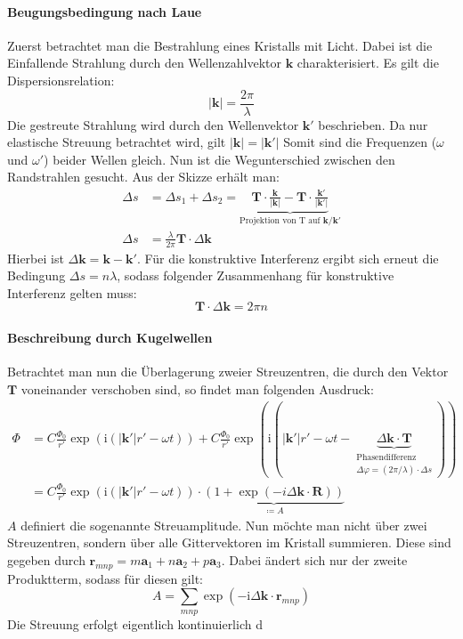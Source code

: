 \paragraph{Beugungsbedingung nach Laue}
Zuerst betrachtet man die Bestrahlung eines Kristalls mit Licht. Dabei ist die Einfallende Strahlung durch den 
Wellenzahlvektor  $\mathbf{k}$ charakterisiert. Es gilt die Dispersionsrelation:
\begin{equation}
	\lvert \mathbf{k} \rvert =\frac{2\pi}{\lambda}
\end{equation}
Die gestreute Strahlung wird durch den Wellenvektor $\mathbf{k}'$ beschrieben. Da nur elastische Streuung betrachtet wird, gilt 
$\lvert \mathbf{k} \rvert=\lvert \mathbf{k}' \rvert$ Somit sind die Frequenzen ($\omega$ und $\omega'$) beider Wellen gleich.
Nun ist die Wegunterschied zwischen den Randstrahlen gesucht. Aus der Skizze erhält man:
\begin{align*}
	\Delta s &= \Delta s_{1} + \Delta s_{2} = \underbrace{ \mathbf{T} \cdot \frac{\mathbf{k}}{\lvert \mathbf{k} \rvert }-
	\mathbf{T}\cdot \frac{\mathbf{k}'}{\lvert \mathbf{k}' \rvert}  }_{ \text{Projektion von T auf } 
	\mathbf{k}/\mathbf{k'} } \\
	\Delta s &=  \frac{\lambda}{2\pi} \mathbf{T}\cdot\Delta \mathbf{k}
\end{align*}
Hierbei ist $\Delta \mathbf{k} = \mathbf{k}-\mathbf{k}'$. Für die konstruktive Interferenz ergibt sich erneut die Bedingung $\Delta s = n \lambda$, sodass folgender Zusammenhang für konstruktive Interferenz gelten muss: 
\begin{equation}
	\mathbf{T}\cdot\Delta \mathbf{k} =2\pi n
\end{equation}

\paragraph{Beschreibung durch Kugelwellen}
Betrachtet man nun die Überlagerung zweier Streuzentren, die durch den Vektor $\mathbf{T}$ voneinander verschoben sind, so findet man folgenden Ausdruck:
\begin{align*}
	\Phi &= C \frac{\Phi_{0}}{r'}\exp(\mathrm{i}(\lvert \mathbf{k}' \rvert r'-\omega t)) + C\frac{\Phi_{0}}{r'}
	\exp(\mathrm{i}(\lvert \mathbf{k}' \rvert r'-\omega t- \underbrace{ \Delta \mathbf{k}\cdot \mathbf{T} }_{ 
	\substack{\text{Phasendifferenz} \\ \Delta\varphi=(2\pi / \lambda) \cdot \Delta s  }})) \\
	&=C \frac{\Phi_{0}}{r'}\exp(\mathrm{i}(\lvert \mathbf{k}' \rvert r'-\omega t))\cdot\underbrace{ (1+\exp(-i \Delta 
	\mathbf{k}\cdot \mathbf{R})) }_{ \coloneqq A }
\end{align*}
$A$ definiert die sogenannte Streuamplitude. Nun möchte man nicht über zwei Streuzentren, sondern über alle Gittervektoren 
im Kristall summieren. Diese sind gegeben durch $\mathbf{r}_{mnp}=m\mathbf{a}_{1}+n\mathbf{a}_{2}+p\mathbf{a}_{3}$. Dabei 
ändert sich nur der zweite Produktterm, sodass für diesen gilt:
\begin{equation}
	A = \sum_{mnp}\exp(-\mathrm{i} \Delta \mathbf{k}\cdot \mathbf{r}_{mnp})
\end{equation}
Die Streuung erfolgt eigentlich kontinuierlich d
